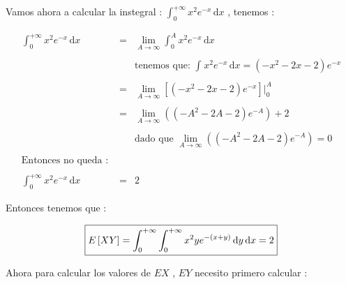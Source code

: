 \documentclass[12pt]{article}
\begin{document}
    \begin{flushleft}
        Vamos ahora a calcular la instegral : $\displaystyle \int_{0}^{+\infty} x^2e^{-x}  \,\mathrm{d}x$ , tenemos : 
    \end{flushleft}

    \begin{equation*}
        \begin{array}{rcl}
            \displaystyle \int_{0}^{+\infty} x^2e^{-x}  \,\mathrm{d}x & = & \displaystyle \lim_{A \to \infty} \int_{0}^{A} x^2e^{-x}  \,\mathrm{d}x  
            \\
            \\
            && \mbox{tenemos que: $\displaystyle \int_{}^{} x^2e^{-x}  \,\mathrm{d}x = \left(-x^2 -2x -2 \right)e^{-x}$}
            \\
            \\
            & = &\displaystyle \lim_{A \to \infty}  \left[\left(-x^2 -2x -2 \right)e^{-x}\right] \vert_{0}^{A}
            \\
            \\
            & = &\displaystyle  \lim_{A \to \infty}  \left(\left(-A^2 -2A -2 \right)e^{-A}\right) + 2 
            \\
            \\
            && \mbox{dado que $\displaystyle  \lim_{A \to \infty}  \left(\left(-A^2 -2A -2 \right)e^{-A}\right) = 0  $}
            \\
            \\
            \mbox{Entonces no queda : } &&
            \\
            \\
            \displaystyle \int_{0}^{+\infty} x^2e^{-x}  \,\mathrm{d}x  & = & 2 
        \end{array}
    \end{equation*}

    \begin{flushleft}
        Entonces tenemos que : 
    \end{flushleft}

    \begin{equation*}
        \fbox{$
            E\left[XY\right] = \displaystyle \int_{0}^{+\infty} \int_{0}^{+\infty} x^2ye^{-\left(x+y\right)} \,\mathrm{d}y  \,\mathrm{d}x = 2
        $}
    \end{equation*}

    \vspace{1cm}

    \begin{flushleft}
        Ahora para calcular los valores de $EX$ , $EY$ necesito primero calcular :
    \end{flushleft}
\end{document}
